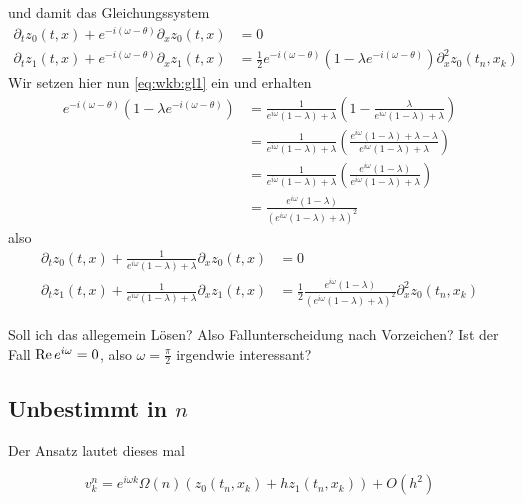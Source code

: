 und damit das Gleichungssystem
{\small
\begin{align}
\partial_t z_0(t,x) + e^{-i (\omega - \theta)} \partial_x z_0(t,x) &= 0\\
\partial_t z_1(t,x) + e^{-i (\omega - \theta)} \partial_x z_1(t,x) &= \frac{1}{2} e^{- i(\omega - \theta)} \left(1 - \lambda e^{-i(\omega - \theta)} \right) \partial^2_x z_0(t_n, x_k)
\end{align}}
Wir setzen hier nun \eqref{eq:wkb:gl1} ein und erhalten
\begin{align*}
e^{- i(\omega - \theta)} \left(1 - \lambda e^{-i(\omega - \theta)} \right) &= \frac{1}{ e^{i \omega} (1 -  \lambda) + \lambda } \left( 1 - \frac{\lambda}{ e^{i \omega} (1 -  \lambda) + \lambda } \right)\\
&= \frac{1}{ e^{i \omega} (1 -  \lambda) + \lambda } \left( \frac{e^{i \omega} (1 -  \lambda) + \lambda - \lambda}{ e^{i \omega} (1 -  \lambda) + \lambda } \right)\\
&= \frac{1}{ e^{i \omega} (1 -  \lambda) + \lambda } \left( \frac{e^{i \omega} (1 -  \lambda) }{ e^{i \omega} (1 -  \lambda) + \lambda } \right)\\
&= \frac{e^{i \omega} (1 -  \lambda) }{ \left(e^{i \omega} (1 -  \lambda) + \lambda \right)^2 }
\end{align*}
also
{\small
\begin{align}
\partial_t z_0(t,x) + \frac{1}{ e^{i \omega} (1 -  \lambda) + \lambda } \partial_x z_0(t,x) &= 0\\
\partial_t z_1(t,x) + \frac{1}{ e^{i \omega} (1 -  \lambda) + \lambda } \partial_x z_1(t,x) &= \frac{1}{2} \frac{e^{i \omega} (1 -  \lambda) }{ \left(e^{i \omega} (1 -  \lambda) + \lambda \right)^2 } \partial^2_x z_0(t_n, x_k)
\end{align}}

\begin{note}
Soll ich das allegemein Lösen?
Also Fallunterscheidung nach Vorzeichen?
Ist der Fall $\operatorname{Re} e^{i \omega} = 0$, also $\omega = \frac{\pi}{2}$ irgendwie interessant?
\end{note}

\subsection*{Unbestimmt in $n$}

Der Ansatz lautet dieses mal 

\[ v^n_k = e^{i \omega k} \Omega(n) \left( z_0(t_n, x_k) + h z_1(t_n, x_k) \right) + O(h^2) \]

